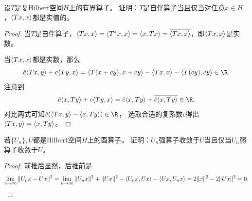 \begin{7}
    设$T$是复Hilbert空间$H$上的有界算子。
    证明：$T$是自伴算子当且仅当对任意$x \in H$，$\langle Tx,x \rangle$都是实值的。
\end{7}
\begin{proof}
    当$T$是自伴算子，$\langle Tx,x \rangle=\langle T^*x,x \rangle=\langle x,Tx \rangle
    =\overline{\langle Tx,x \rangle}$，即$\langle Tx,x \rangle$是实数。
    
    当$\langle Tx,x \rangle$都是实数，那么
    \[\bar{c}\la Tx,y \ra+c\la Ty,x \ra
    =\la T(x+cy),x+cy \ra-\la Tx,x \ra-\la T(cy),cy \ra\in\R,\]
    注意到
    \[\bar{c}\la x,Ty \ra+c\la Ty,x \ra=\bar{c}\la x,Ty \ra+\overline{\bar{c}\la x,Ty \ra}\in\R,\]
    对比两式可知$\bar{c}(\la Tx,y \ra-\la x,Ty \ra)\in\R$，
    选取合适的复系数$c$得出$\langle Tx,y \rangle=\langle x,Ty \rangle$。
\end{proof}

\begin{9}
    若$\{U_n\},U$都是Hilbert空间$H$上的酉算子。
    证明：$U_n$强算子收敛于$U$当且仅当$U_n$弱算子收敛于$U$。
\end{9}
\begin{proof}
    前推后显然，后推前是
    \[\lim_{n\to\infty}\|U_nx-Ux\|^2
    =\lim_{n\to\infty}\|U_nx\|^2+\|Ux\|^2-\langle U_nx,Ux \rangle-\langle Ux,U_nx \rangle
    =2\|x\|^2-2\|Ux\|^2=0.\qedhere\]
\end{proof}


